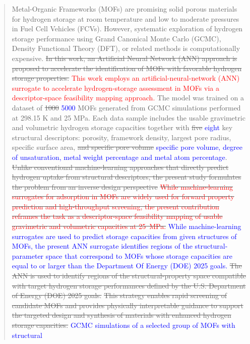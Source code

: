 \documentclass[review]{elsarticle}
\begin{document}
\begin{frontmatter}
\begin{abstract}
Metal-Organic Frameworks (MOFs) are promising solid porous materials for 
hydrogen storage at room temperature and low to moderate pressures in Fuel Cell 
Vehicles (FCVs). However, systematic exploration of hydrogen storage 
performance using Grand Canonical Monte Carlo (GCMC), Density Functional Theory 
(DFT), or related methods is computationally expensive. \sout{In this work, an 
Artificial Neural Network (ANN) approach is proposed to accelerate the 
identification of MOFs with favorable hydrogen storage properties.}
\textcolor{red}{This work employs an artificial-neural-network (ANN) surrogate 
to accelerate hydrogen-storage assessment in MOFs via a descriptor-space 
feasibility mapping approach.} The model was trained on a dataset of 
\sout{1000} \textcolor{blue}{5000} MOFs generated from GCMC simulations 
performed at 298.15 K and 25 MPa. Each data sample includes the usable 
gravimetric and volumetric hydrogen storage capacities together with 
\sout{five} \textcolor{blue}{eight} key structural descriptors: porosity, 
framework density, largest pore radius, specific surface area, \sout{and 
specific pore volume} \textcolor{blue}{specific pore volume, degree of 
unsaturation, metal weight percentage and metal atom percentage}. \sout{Unlike 
conventional machine-learning approaches that directly predict hydrogen uptake 
from structural descriptors, the present study formulates the problem from an 
inverse design perspective} \sout{\textcolor{red}{While machine-learning 
surrogates for adsorption in MOFs are widely used for forward property 
prediction and high-throughput screening, the present contribution reframes 
the task as a descriptor-space feasibility mapping of usable gravimetric and 
volumetric capacities at 25~MPa.}} \textcolor{blue}{While machine-learning 
surrogates are used to predict storage capacities from given structures of 
MOFs, the present ANN surrogate identifies regions of the structural-parameter 
space that correspond to MOFs whose storage capacities are equal to or larger 
than the Department Of Energy (DOE) 2025 goals.} \sout{The ANN is used to 
identify regions of the structural-property space compatible with target 
hydrogen storage performances defined by the U.S. Department of Energy (DOE) 
2025 goals.} \sout{This strategy enables rapid screening of candidate MOFs and 
provides physically interpretable guidance to support the targeted design and 
synthesis of materials with enhanced hydrogen storage capacities.} 
\textcolor{blue}{GCMC simulations of a selected group of MOFs with structural 
}
\end{abstract}
\end{frontmatter}
\end{document}
